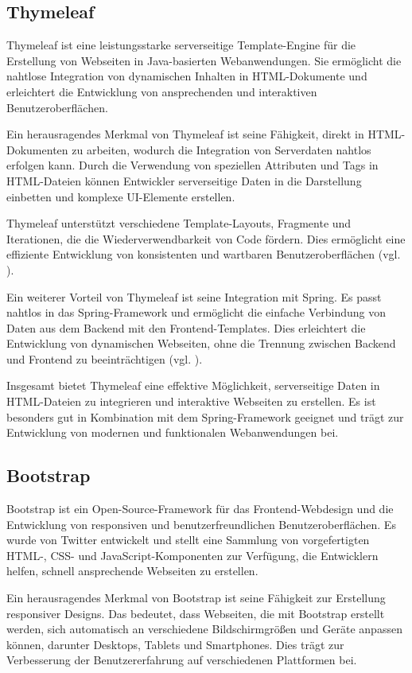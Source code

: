 \documentclass[fontsize=12pt,openright,oneside,paper=a4,BCOR=1cm]{scrbook}
\begin{document}
\subsection{Thymeleaf}

Thymeleaf ist eine leistungsstarke serverseitige Template-Engine für die Erstellung von Webseiten in Java-basierten Webanwendungen. Sie ermöglicht die nahtlose Integration von dynamischen Inhalten in HTML-Dokumente und erleichtert die Entwicklung von ansprechenden und interaktiven Benutzeroberflächen.

Ein herausragendes Merkmal von Thymeleaf ist seine Fähigkeit, direkt in HTML-Dokumenten zu arbeiten, wodurch die Integration von Serverdaten nahtlos erfolgen kann. Durch die Verwendung von speziellen Attributen und Tags in HTML-Dateien können Entwickler serverseitige Daten in die Darstellung einbetten und komplexe UI-Elemente erstellen.

Thymeleaf unterstützt verschiedene Template-Layouts, Fragmente und Iterationen, die die Wiederverwendbarkeit von Code fördern. Dies ermöglicht eine effiziente Entwicklung von konsistenten und wartbaren Benutzeroberflächen (vgl. \cite{thymeleaf}).

Ein weiterer Vorteil von Thymeleaf ist seine Integration mit Spring. Es passt nahtlos in das Spring-Framework und ermöglicht die einfache Verbindung von Daten aus dem Backend mit den Frontend-Templates. Dies erleichtert die Entwicklung von dynamischen Webseiten, ohne die Trennung zwischen Backend und Frontend zu beeinträchtigen (vgl. \cite{thymeleafspring}). 

Insgesamt bietet Thymeleaf eine effektive Möglichkeit, serverseitige Daten in HTML-Dateien zu integrieren und interaktive Webseiten zu erstellen. Es ist besonders gut in Kombination mit dem Spring-Framework geeignet und trägt zur Entwicklung von modernen und funktionalen Webanwendungen bei.

\subsection{Bootstrap}

Bootstrap ist ein Open-Source-Framework für das Frontend-Webdesign und die Entwicklung von responsiven und benutzerfreundlichen Benutzeroberflächen. Es wurde von Twitter entwickelt und stellt eine Sammlung von vorgefertigten HTML-, CSS- und JavaScript-Komponenten zur Verfügung, die Entwicklern helfen, schnell ansprechende Webseiten zu erstellen.

Ein herausragendes Merkmal von Bootstrap ist seine Fähigkeit zur Erstellung responsiver Designs. Das bedeutet, dass Webseiten, die mit Bootstrap erstellt werden, sich automatisch an verschiedene Bildschirmgrößen und Geräte anpassen können, darunter Desktops, Tablets und Smartphones. Dies trägt zur Verbesserung der Benutzererfahrung auf verschiedenen Plattformen bei.
\end{document}
